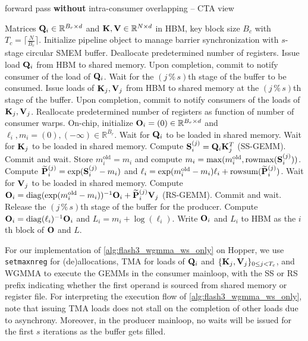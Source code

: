 \begin{algorithm}[H]
    \caption{\small\label{alg:flash3_wgmma_ws_only}\fat forward pass \textbf{without} intra-consumer overlapping -- CTA view}
    \begin{algorithmic}[1]
\REQUIRE Matrices $\mathbf{Q}_i \in \mathbb{R}^{B_r \times d}$ and $\mathbf{K}, \mathbf{V} \in \mathbb{R}^{N \times d}$ in HBM, key block size $B_c$ with $T_c = \lceil \frac{N}{B_c} \rceil$.
\STATE Initialize pipeline object to manage barrier synchronization with $s$-stage circular SMEM buffer.
\STATE Deallocate predetermined number of registers.
\STATE Issue load $\mathbf{Q}_i$ from HBM to shared memory.
\STATE Upon completion, commit to notify consumer of the load of $\mathbf{Q}_i$.
    \STATE Wait for the $(j\,\%\,s)$th stage of the buffer to be consumed.
    \STATE Issue loads of $\mathbf{K}_j, \mathbf{V}_j$ from HBM to shared memory at the $(j\,\%\,s)$th stage of the buffer.
    \STATE Upon completion, commit to notify consumers of the loads of $\mathbf{K}_j, \mathbf{V}_j$.
\ENDFOR
\ELSE
\STATE Reallocate predetermined number of registers as function of number of consumer warps.
\STATE On-chip, initialize $\mathbf{O}_i = (0) \in \mathbb{R}^{B_r \times d}$ and $\ell_i, m_i = (0), (-\infty) \in \mathbb{R}^{B_r}$.
\STATE Wait for $\mathbf{Q}_i$ to be loaded in shared memory.
\STATE Wait for $\mathbf{K}_j$ to be loaded in shared memory.
\STATE Compute $\mathbf{S}_i^{(j)} = \mathbf{Q}_i \mathbf{K}_j^T$ (SS-GEMM). Commit and wait. \label{alg:ws_only_gemm1}
\STATE Store $m_i^{\mathrm{old}} = m_i$ and compute $m_i = \mathrm{max}(m_i^{\mathrm{old}}, \mathrm{rowmax}(\mathbf{S}_i^{(j)}))$. \label{code-ws:softmax_start}
\STATE Compute $\widetilde{\mathbf{P}}_i^{(j)} = \mathrm{exp}(\mathbf{S}_i^{(j)} - m_i)$ and $\ell_i = \mathrm{exp}(m_i^{\mathrm{old}} - m_i) \ell_i + \mathrm{rowsum}(\widetilde{\mathbf{P}}_i^{(j)})$. \label{code-ws:softmax_end}
\STATE Wait for $\mathbf{V}_j$ to be loaded in shared memory.
\STATE Compute $\mathbf{O}_i = \mathrm{diag}(\mathrm{exp}(m_i^{\mathrm{old}} - m_i))^{-1} \mathbf{O}_i + \widetilde{\mathbf{P}}_i^{(j)} \mathbf{V}_j$ (RS-GEMM). Commit and wait. \label{alg:ws_only_gemm2}
\STATE Release the $(j\,\%\,s)$th stage of the buffer for the producer.
\ENDFOR
\STATE Compute $\mathbf{O}_i = \mathrm{diag}(\ell_i)^{-1} \mathbf{O}_i$ and $L_i = m_i + \log(\ell_i)$.
\STATE Write $\mathbf{O}_i$ and $L_i$ to HBM as the $i$th block of $\mathbf{O}$ and $L$.
\ENDIF
\end{algorithmic}
\end{algorithm}

For our implementation of \cref{alg:flash3_wgmma_ws_only} on Hopper, we use \verb|setmaxnreg| for (de)allocations, TMA for loads of $\mathbf{Q}_i$ and $\{ \mathbf{K}_j, \mathbf{V}_j \}_{0 \leq j < T_c}$, and WGMMA to execute the GEMMs in the consumer mainloop, with the SS or RS prefix indicating whether the first operand is sourced from shared memory or register file.
For interpreting the execution flow of \cref{alg:flash3_wgmma_ws_only}, note that issuing TMA loads does not stall on the completion of other loads due to asynchrony.
Moreover, in the producer mainloop, no waits will be issued for the first $s$ iterations as the buffer gets filled.

